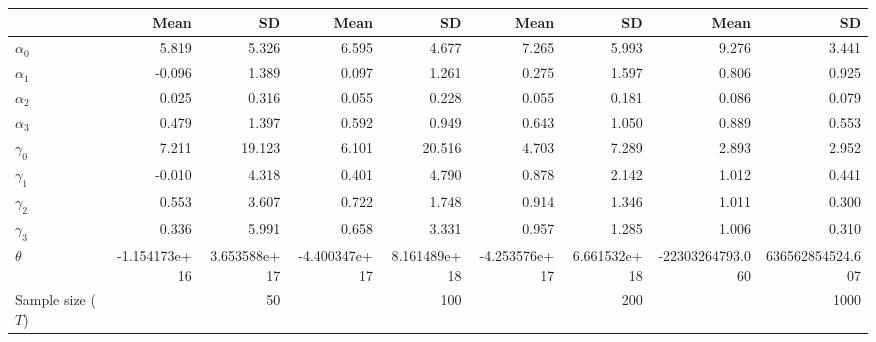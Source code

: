 
\begin{tabular}[t]{lrrrrrrrr}
\toprule
  & Mean & SD & Mean  & SD  & Mean   & SD   & Mean    & SD   \\
\midrule
$\alpha_{0}$ & 5.819 & 5.326 & 6.595 & 4.677 & 7.265 & 5.993 & 9.276 & 3.441\\
$\alpha_{1}$ & -0.096 & 1.389 & 0.097 & 1.261 & 0.275 & 1.597 & 0.806 & 0.925\\
$\alpha_{2}$ & 0.025 & 0.316 & 0.055 & 0.228 & 0.055 & 0.181 & 0.086 & 0.079\\
$\alpha_{3}$ & 0.479 & 1.397 & 0.592 & 0.949 & 0.643 & 1.050 & 0.889 & 0.553\\
$\gamma_{0}$ & 7.211 & 19.123 & 6.101 & 20.516 & 4.703 & 7.289 & 2.893 & 2.952\\
$\gamma_{1}$ & -0.010 & 4.318 & 0.401 & 4.790 & 0.878 & 2.142 & 1.012 & 0.441\\
$\gamma_{2}$ & 0.553 & 3.607 & 0.722 & 1.748 & 0.914 & 1.346 & 1.011 & 0.300\\
$\gamma_{3}$ & 0.336 & 5.991 & 0.658 & 3.331 & 0.957 & 1.285 & 1.006 & 0.310\\
$\theta$ & -1.154173e+16 & 3.653588e+17 & -4.400347e+17 & 8.161489e+18 & -4.253576e+17 & 6.661532e+18 & -22303264793.060 & 636562854524.607\\
Sample size ($T$) &  & 50 &  & 100 &  & 200 &  & 1000\\
\bottomrule
\end{tabular}
